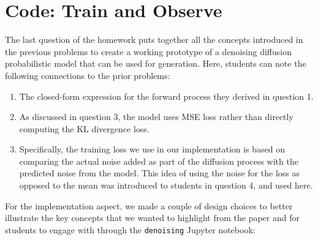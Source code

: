 \documentclass{article}
\begin{document}
\section{Code: Train and Observe}

The last question of the homework puts together all the concepts introduced in the previous problems to create a working prototype of a denoising diffusion probabilistic model that can be used for generation.
Here, students can note the following connections to the prior problems:

\begin{enumerate}
    \item The closed-form expression for the forward process they derived in question 1.
    
    \item As discussed in question 3, the model uses MSE loss rather than directly computing the KL divergence loss.

    \item Specifically, the training loss we use in our implementation is based on comparing the actual noise added as part of the diffusion process with the predicted noise from the model. This idea of using the noise for the loss as opposed to the mean was introduced to students in question 4, and used here.

\end{enumerate}

For the implementation aspect, we made a couple of design choices to better illustrate the key concepts that we wanted to highlight from the paper and for students to engage with through the \verb|denoising| Jupyter notebook:
\end{document}

